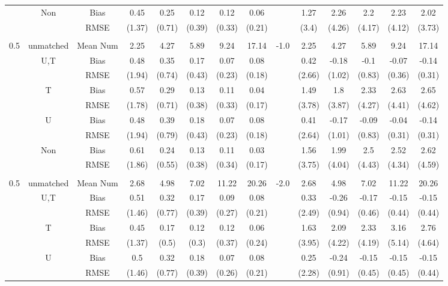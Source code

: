 \begin{tabular}{@{\extracolsep{5pt}}lc|cccccc|lccccc}
 & Non & Bias & 0.45 & 0.25 & 0.12 & 0.12 & 0.06 &  & 1.27 & 2.26 & 2.2 & 2.23 & 2.02 \\
 &  & RMSE & (1.37) & (0.71) & (0.39) & (0.33) & (0.21) &  & (3.4) & (4.26) & (4.17) & (4.12) & (3.73) \\
 &  &  &  &  &  &  &  &  &  &  &  &  &  \\
0.5 & unmatched & Mean Num & 2.25 & 4.27 & 5.89 & 9.24 & 17.14 & -1.0 & 2.25 & 4.27 & 5.89 & 9.24 & 17.14 \\
 & U,T & Bias & 0.48 & 0.35 & 0.17 & 0.07 & 0.08 &  & 0.42 & -0.18 & -0.1 & -0.07 & -0.14 \\
 &  & RMSE & (1.94) & (0.74) & (0.43) & (0.23) & (0.18) &  & (2.66) & (1.02) & (0.83) & (0.36) & (0.31) \\
 & T & Bias & 0.57 & 0.29 & 0.13 & 0.11 & 0.04 &  & 1.49 & 1.8 & 2.33 & 2.63 & 2.65 \\
 &  & RMSE & (1.78) & (0.71) & (0.38) & (0.33) & (0.17) &  & (3.78) & (3.87) & (4.27) & (4.41) & (4.62) \\
 & U & Bias & 0.48 & 0.39 & 0.18 & 0.07 & 0.08 &  & 0.41 & -0.17 & -0.09 & -0.04 & -0.14 \\
 &  & RMSE & (1.94) & (0.79) & (0.43) & (0.23) & (0.18) &  & (2.64) & (1.01) & (0.83) & (0.31) & (0.31) \\
 & Non & Bias & 0.61 & 0.24 & 0.13 & 0.11 & 0.03 &  & 1.56 & 1.99 & 2.5 & 2.52 & 2.62 \\
 &  & RMSE & (1.86) & (0.55) & (0.38) & (0.34) & (0.17) &  & (3.75) & (4.04) & (4.43) & (4.34) & (4.59) \\
 &  &  &  &  &  &  &  &  &  &  &  &  &  \\
0.5 & unmatched & Mean Num & 2.68 & 4.98 & 7.02 & 11.22 & 20.26 & -2.0 & 2.68 & 4.98 & 7.02 & 11.22 & 20.26 \\
 & U,T & Bias & 0.51 & 0.32 & 0.17 & 0.09 & 0.08 &  & 0.33 & -0.26 & -0.17 & -0.15 & -0.15 \\
 &  & RMSE & (1.46) & (0.77) & (0.39) & (0.27) & (0.21) &  & (2.49) & (0.94) & (0.46) & (0.44) & (0.44) \\
 & T & Bias & 0.45 & 0.17 & 0.12 & 0.12 & 0.06 &  & 1.63 & 2.09 & 2.33 & 3.16 & 2.76 \\
 &  & RMSE & (1.37) & (0.5) & (0.3) & (0.37) & (0.24) &  & (3.95) & (4.22) & (4.19) & (5.14) & (4.64) \\
 & U & Bias & 0.5 & 0.32 & 0.18 & 0.07 & 0.08 &  & 0.25 & -0.24 & -0.15 & -0.15 & -0.15 \\
 &  & RMSE & (1.46) & (0.77) & (0.39) & (0.26) & (0.21) &  & (2.28) & (0.91) & (0.45) & (0.45) & (0.44) \\

\end{tabular}
